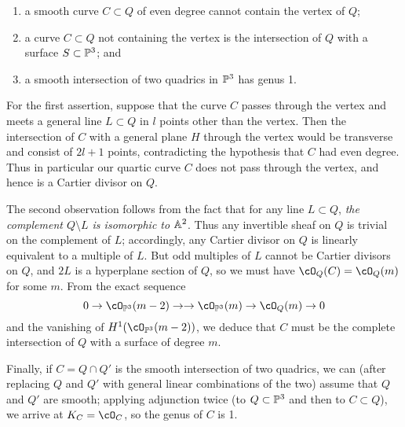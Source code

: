 \begin{enumerate}
\item a smooth curve $C \subset Q$ of even degree cannot contain the vertex of $Q$;
\item a curve $C \subset Q$ not containing the vertex is the intersection of $Q$ with a surface $S \subset \PP^3$; and
\item a smooth  intersection of two quadrics in $\PP^3$ has genus 1.
\end{enumerate}

For the first assertion, suppose that the curve $C$ passes through the vertex and meets a general line $L \subset Q$ in $l$ points other than the vertex. Then the intersection of $C$ with a general plane $H$ through the vertex would be transverse and consist of $2l+1$ points, contradicting the hypothesis that $C$ had even degree. Thus in particular our quartic curve $C$ does not pass through the vertex, and hence is a Cartier divisor on $Q$.

The second observation follows from the fact that for any line $L \subset Q$, \emph{the complement $Q \setminus L$ is isomorphic to $\AA^2$}. Thus any invertible sheaf on $Q$ is trivial on the complement of $L$; accordingly, any Cartier divisor on $Q$ is linearly equivalent to a multiple of $L$. But odd multiples of $L$ cannot be Cartier divisors on $Q$, and $2L$ is a hyperplane section of $Q$, so we must have $\cO_Q(C) = \cO_Q(m)$ for some $m$. From the exact sequence
$$
0 \to \cO_{\PP^3}(m-2) \to \to \cO_{\PP^3}(m) \to \cO_{Q}(m)  \to 0
$$
and the vanishing of $H^1(\cO_{\PP^3}(m-2))$, we deduce that $C$ must be the complete intersection of $Q$ with a surface of degree $m$.

Finally, if $C = Q \cap Q'$ is the smooth intersection of two quadrics, we can (after replacing $Q$ and $Q'$ with general linear combinations of the two) assume that $Q$ and $Q'$ are smooth; applying adjunction twice (to $Q \subset \PP^3$ and then to $C \subset Q$), we arrive at $K_C = \cO_C$, so the genus of $C$ is 1.

